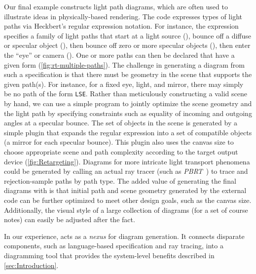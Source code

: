 Our final example constructs light path diagrams, which are often used to illustrate ideas in physically-based rendering.  The \Substance{} code expresses types of light paths via Heckbert's regular expression notation.  For instance, the expression  specifies a family of light paths that start at a light source (), bounce off a diffuse or specular object (), then bounce off zero or more specular objects (), then enter the ``eye'' or camera ().  One or more paths can then be declared that have a given form (\cref{fig:rt-multiple-paths}).  The challenge in generating a diagram from such a specification is that there must be geometry in the scene that supports the given path(s).  For instance, for a fixed eye, light, and mirror, there may simply be no path of the form \texttt{LSE}.  Rather than meticulously constructing a valid scene by hand, we can use a simple \Style{} program to jointly optimize the scene geometry and the light path by specifying constraints such as equality of incoming and outgoing angles at a specular bounce.  The set of objects in the scene is generated by a simple plugin that expands the regular expression into a set of compatible objects (\eg a mirror for each specular bounce).  This plugin also uses the canvas size to choose appropriate scene and path complexity according to the target output device (\cref{fig:Retargeting}).  Diagrams for more intricate light transport phenomena could be generated by calling an actual ray tracer (such as \emph{PBRT}~\cite{Pharr:2016:PBR}) to trace and rejection-sample paths by path type.  The added value of generating the final diagrams with \Penrose{} is that initial path and scene geometry generated by the external code can be further optimized to meet other design goals, such as the canvas size. Additionally, the visual style of a large collection of diagrams (\eg for a set of course notes) can easily be adjusted after the fact.

In our experience, \Penrose{} acts as a \emph{nexus} for diagram generation. It connects disparate components, such as language-based specification and ray tracing, into a diagramming tool that provides the system-level benefits described in \cref{sec:Introduction}.




